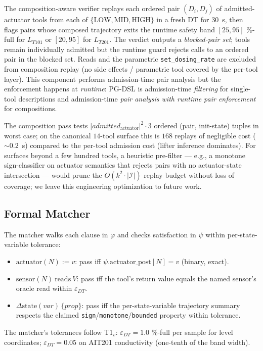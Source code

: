 The composition-aware verifier replays each ordered pair
$(D_i, D_j)$ of admitted-actuator tools from each of $\{\text{LOW},
\text{MID}, \text{HIGH}\}$ in a fresh DT for $30$~s, then flags pairs
whose composed trajectory exits the runtime safety band
$[25, 95]$ \%-full for $L_{T101}$ or $[20, 95]$ for $L_{T201}$. The
verdict outputs a \emph{blocked-pair set}; tools remain individually
admitted but the runtime guard rejects calls to an ordered pair in
the blocked set. Reads and the parametric \texttt{set\_dosing\_rate}
are excluded from composition replay (no side effects / parametric
tool covered by the per-tool layer). This component performs
admission-time pair analysis but the enforcement happens at
\emph{runtime}: PG-DSL is admission-time \emph{filtering} for
single-tool descriptions and admission-time \emph{pair analysis with
runtime pair enforcement} for compositions.

The composition pass tests $|\mathit{admitted}_{\text{actuator}}|^2
\cdot 3$ ordered (pair, init-state) tuples in worst case; on the
canonical $14$-tool surface this is $168$ replays of negligible cost
($\sim 0.2$~s) compared to the per-tool admission cost (lifter
inference dominates). For surfaces beyond a few hundred tools, a
heuristic pre-filter --- e.g., a monotone sign-classifier on
actuator semantics that rejects pairs with no actuator-state
intersection --- would prune the $O(k^2 \cdot |\mathcal{I}|)$ replay
budget without loss of coverage; we leave this engineering
optimization to future work.

\subsection{Formal Matcher}

The matcher walks each clause in $\varphi$ and checks satisfaction in
$\psi$ within per-state-variable tolerance:
\begin{itemize}
\item $\text{actuator}(N) := v$: pass iff
      $\psi.\text{actuator\_post}[N] = v$ (binary, exact).
\item $\text{sensor}(N)\ \text{reads}\ V$: pass iff the tool's
      return value equals the named sensor's oracle read within
      $\varepsilon_{DT}$.
\item $\Delta\text{state}(\textit{var})\,\{\textit{prop}\}$: pass iff
      the per-state-variable trajectory summary respects the claimed
      \texttt{sign}/\texttt{monotone}/\texttt{bounded} property within
      tolerance.
\end{itemize}
The matcher's tolerances follow T1${}_v$: $\varepsilon_{DT} = 1.0$
\%-full per sample for level coordinates; $\varepsilon_{DT} = 0.05$
on AIT201 conductivity (one-tenth of the band width).

